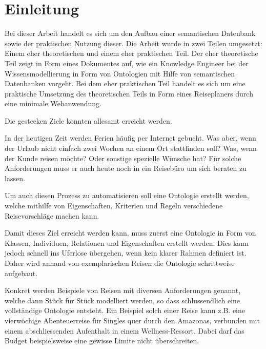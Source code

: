 \chapter{Einleitung}
\label{chap:einleitung}

Bei dieser Arbeit handelt es sich um den Aufbau einer semantischen Datenbank sowie der praktischen Nutzung dieser. Die Arbeit wurde in zwei Teilen umgesetzt: Einem eher theoretischen und einem eher praktischen Teil. Der eher theoretische Teil zeigt in Form eines Dokumentes auf, wie ein Knowledge Engineer bei der Wissensmodellierung in Form von Ontologien mit Hilfe von semantischen Datenbanken vorgeht. Bei dem eher praktischen Teil handelt es sich um eine praktische Umsetzung des theoretischen Teils in Form eines Reiseplaners durch eine minimale Webanwendung.

Die gestecken Ziele konnten allesamt erreicht werden.



In der heutigen Zeit werden Ferien häufig per Internet gebucht. Was aber, wenn der Urlaub nicht einfach zwei Wochen an einem Ort stattfinden soll? Was, wenn der Kunde reisen möchte? Oder sonstige spezielle Wünsche hat? Für solche Anforderungen muss er auch heute noch in ein Reisebüro um sich beraten zu lassen.

Um auch diesen Prozess zu automatisieren soll eine Ontologie erstellt werden, welche mithilfe von Eigenschaften, Kriterien und Regeln verschiedene Reisevorschläge machen kann.

Damit dieses Ziel erreicht werden kann, muss zuerst eine Ontologie in Form von Klassen, Individuen, Relationen und Eigenschaften erstellt werden. Dies kann jedoch schnell ins Uferlose übergehen, wenn kein klarer Rahmen definiert ist. Daher wird anhand von exemplarischen Reisen die Ontologie schrittweise aufgebaut.

Konkret werden Beispiele von Reisen mit diversen Anforderungen genannt, welche dann Stück für Stück modelliert werden, so dass schlussendlich eine vollständige Ontologie entsteht. Ein Beispiel solch einer Reise kann z.B. eine vierwöchige Abenteuerreise für Singles quer durch den Amazonas, verbunden mit einem abschliessenden Aufenthalt in einem Wellness-Ressort. Dabei darf das Budget beispielsweise eine gewisse Limite nicht überschreiten.

